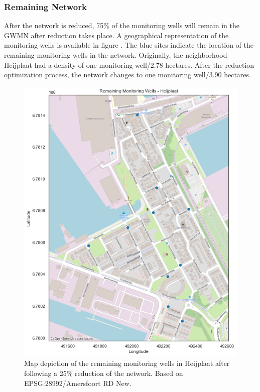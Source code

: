 \subsubsection{Remaining Network}
After the network is reduced, 75\% of the monitoring wells will remain in the GWMN after reduction takes place. A geographical representation of the monitoring wells is available in figure . The blue sites indicate the location of the remaining monitoring wells in the network. Originally, the neighborhood Heijplaat had a density of one monitoring well/2.78 hectares. After the reduction-optimization process, the network changes to one monitoring well/3.90 hectares. 
\begin{figure}[htbp]
    \centering
    \includegraphics[width=0.75\linewidth]{frontmatter/Heijplaat-fig/remheij.png}
    \caption{Map depiction of the remaining monitoring wells in Heijplaat after following a 25\% reduction of the network. Based on EPSG:28992/Amersfoort RD New.}
    \label{afterheij}
\end{figure}



